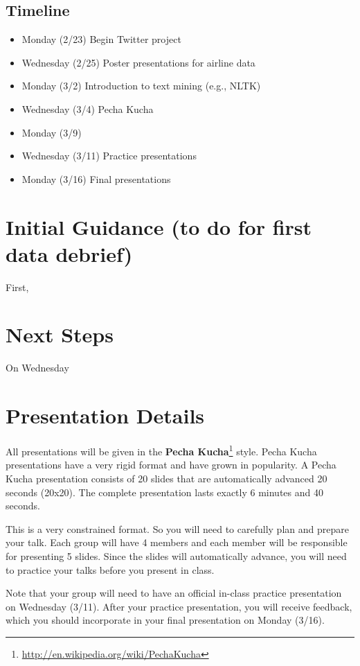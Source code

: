 \documentclass[11pt, oneside]{article}   	%
\begin{document}
\subsection*{Timeline}

\begin{itemize}
\item Monday (2/23) Begin Twitter project
\item Wednesday (2/25) Poster presentations for airline data
\item Monday (3/2) Introduction to text mining (e.g., NLTK)
\item Wednesday (3/4) Pecha Kucha
\item Monday (3/9)
\item Wednesday (3/11) Practice presentations
\item Monday (3/16) Final presentations
\end{itemize}

\section{Initial Guidance (to do for first data debrief)}

First, 

\section{Next Steps}

On Wednesday 

\newpage
\section{Presentation Details}

All presentations will be given in the \textbf{Pecha
Kucha}\footnote{\url{http://en.wikipedia.org/wiki/PechaKucha}} style.  Pecha
Kucha presentations have a very rigid format and have grown in popularity.  A
Pecha Kucha presentation consists of 20 slides that are automatically advanced
20 seconds (20x20).  The complete presentation lasts exactly 6 minutes and 40
seconds.

This is a very constrained format.  So you will need to carefully plan and
prepare your talk.  Each group will have 4 members and each member will
be responsible for presenting 5 slides.  Since the slides will automatically
advance, you will need to practice your talks before you present in class.

Note that your group will need to have an official in-class practice presentation
on Wednesday (3/11).  After your practice presentation, you will receive feedback,
which you should incorporate in your final presentation on Monday (3/16).
\end{document}
